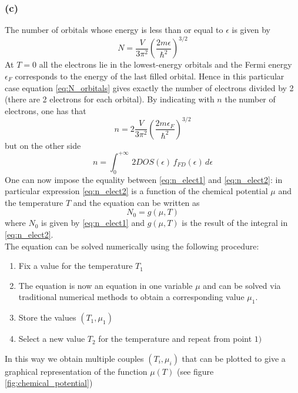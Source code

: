 \documentclass{article}
\begin{document}
\subsubsection*{(c)}
The number of orbitals whose energy is less than or equal to $\epsilon$ is given by 
\begin{equation}
    N = \frac{V}{3\pi^2} \left(\frac{2m\epsilon}{\hbar^2}\right)^{3/2}
    \label{eq:N_orbitals}
\end{equation}
At $T=0$ all the electrons lie in the lowest-energy orbitals and the Fermi energy $\epsilon_F$
corresponds to the energy of the last filled orbital. Hence in this particular case equation \ref{eq:N_orbitals}
gives exactly the number of electrons divided by 2 (there are 2 electrons for each orbital). By indicating with $n$ the number of electrons,
one has that 
\begin{equation}
    n = 2\frac{V}{3\pi^2} \left(\frac{2m\epsilon_F}{\hbar^2}\right)^{3/2}
    \label{eq:n_elect1}
\end{equation}
but on the other side
\begin{equation}
    n = \int_0^{+\infty} \, 2DOS(\epsilon) \, f_{FD}(\epsilon) \, d\epsilon
    \label{eq:n_elect2}
\end{equation}
One can now impose the equality between \ref{eq:n_elect1} and \ref{eq:n_elect2}: in particular expression \ref{eq:n_elect2} is a function of the chemical potential $\mu$ and the temperature $T$ and 
the equation can be written as 
\begin{equation*}
    N_0 = g(\mu, T)
\end{equation*}
where $N_0$ is given by \ref{eq:n_elect1} and $g(\mu, T)$ is the result of the integral in \ref{eq:n_elect2}. \\
The equation can be solved numerically using the following procedure:
\begin{enumerate}
    \item Fix a value for the temperature $T_1$
    \item The equation is now an equation in one variable $\mu$ and can be solved via traditional numerical methods to obtain a corresponding value $\mu_1$.
    \item Store the values $(T_1, \mu_1)$
    \item Select a new value $T_2$ for the temperature and repeat from point $1)$
\end{enumerate}
In this way we obtain multiple couples $(T_i, \mu_i)$ that can be plotted to give a graphical representation of the function $\mu(T)$ (see figure \ref{fig:chemical_potential})
\end{document}
